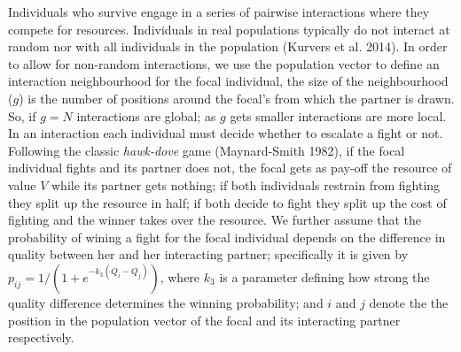 \documentclass[
  12pt,
]{article}
\begin{document}
Individuals who survive engage in a series of pairwise interactions
where they compete for resources. Individuals in real populations
typically do not interact at random nor with all individuals in the
population (Kurvers et al. 2014). In order to allow for non-random
interactions, we use the population vector to define an interaction
neighbourhood for the focal individual, the size of the neighbourhood
(\(g\)) is the number of positions around the focal's from which the
partner is drawn. So, if \(g=N\) interactions are global; as \(g\) gets
smaller interactions are more local. In an interaction each individual
must decide whether to escalate a fight or not. Following the classic
\emph{hawk-dove} game (Maynard-Smith 1982), if the focal individual
fights and its partner does not, the focal gets as pay-off the resource
of value \(V\) while its partner gets nothing; if both individuals
restrain from fighting they split up the resource in half; if both
decide to fight they split up the cost of fighting and the winner takes
over the resource. We further assume that the probability of wining a
fight for the focal individual depends on the difference in quality
between her and her interacting partner; specifically it is given by
\(p_{ij}=1/(1+e^{-k_3(Q_i-Q_j)})\), where \(k_3\) is a parameter
defining how strong the quality difference determines the winning
probability; and \(i\) and \(j\) denote the the position in the
population vector of the focal and its interacting partner respectively.
\end{document}
